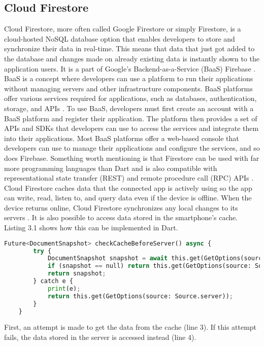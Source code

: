 \subsection{Cloud Firestore}
Cloud Firestore, more often called Google Firestore or simply Firestore, is a cloud-hosted NoSQL database option that enables developers to store and synchronize their data in real-time. This means that data that just got added to the database and changes made on already existing data is instantly shown to the application users. It is a part of Google's Backend-as-a-Service (BaaS) Firebase \cite[p. 458 ]{.baasfirebase}. BaaS is a concept where developers can use a platform to run their applications without managing servers and other infrastructure components. BaaS platforms offer various services required for applications, such as databases, authentication, storage, and APIs \cite{.baasokta}. To use BaaS, developers must first create an account with a BaaS platform and register their application. The platform then provides a set of APIs and SDKs that developers can use to access the services and integrate them into their applications. Most BaaS platforms offer a web-based console that developers can use to manage their applications and configure the services, and so does Firebase. Something worth mentioning is that Firestore can be used with far more programming languages than Dart and is also compatible with representational state transfer (REST) and remote procedure call (RPC) APIs \cite{.firestore}.
\newline \\
Cloud Firestore caches data that the connected app is actively using so the app can write, read, listen to, and query data even if the device is offline. When the device returns online, Cloud Firestore synchronizes any local changes to its servers \cite{.firestore}. It is also possible to access data stored in the smartphone's cache. Listing 3.1 shows how this can be implemented in Dart.
\pagebreak
\begin{lstlisting}[language=Python, caption={Firestore and Dart - getting Cache-data}]
	Future<DocumentSnapshot> checkCacheBeforeServer() async {
		try {
			DocumentSnapshot snapshot = await this.get(GetOptions(source: Source.cache));
			if (snapshot == null) return this.get(GetOptions(source: Source.server));
			return snapshot;
		} catch e {
			print(e);
			return this.get(GetOptions(source: Source.server));
		}
	}	
\end{lstlisting}
\noindent
First, an attempt is made to get the data from the cache (line 3). If this attempt fails, the data stored in the server is accessed instead (line 4).

